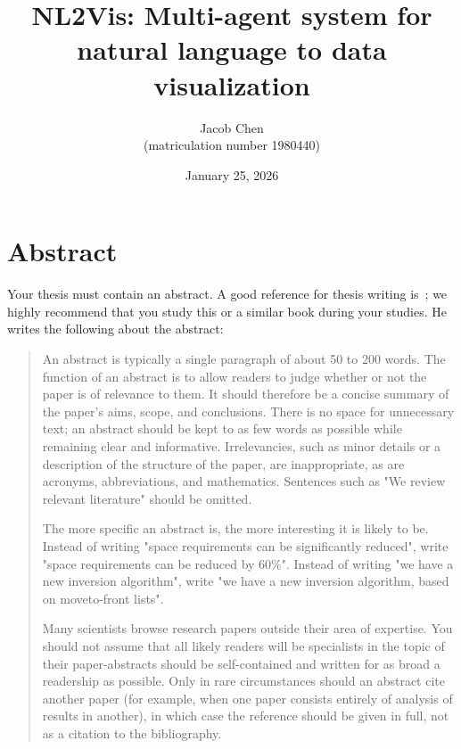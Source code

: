 \documentclass[a4paper,oneside,bibliography=totoc]{scrbook}
\begin{document}
\frontmatter \subject{Master Thesis} %
\title{NL2Vis: Multi-agent system for natural language to data visualization}
\author{Jacob Chen\\
  (matriculation number 1980440)} \date{January 25, 2026}
\publishers{{\small Submitted to}\\
  Social Data Science Group\\
  Prof.\ Dr.\ Marc Ratkovic\\
  University of Mannheim\\}
\maketitle

\chapter{Abstract}

Your thesis must contain an abstract. A good reference for thesis writing
is~\citet{zobel2014}; we highly recommend that you study this or a similar book
during your studies. He writes the following about the abstract:

\blockcquote{zobel2004}{%
  An abstract is typically a single paragraph of about 50 to 200 words. The
  function of an abstract is to allow readers to judge whether or not the paper
  is of relevance to them. It should therefore be a concise summary of the
  paper's aims, scope, and conclusions. There is no space for unnecessary text;
  an abstract should be kept to as few words as possible while remaining clear
  and informative. Irrelevancies, such as minor details or a description of the
  structure of the paper, are inappropriate, as are acronyms, abbreviations, and
  mathematics. Sentences such as "We review relevant literature" should be
  omitted.

  The more specific an abstract is, the more interesting it is likely to be.
  Instead of writing "space requirements can be significantly reduced", write
  "space requirements can be reduced by 60\%". Instead of writing "we have a new
  inversion algorithm", write "we have a new inversion algorithm, based on
  move­to-front lists".

  Many scientists browse research papers outside their area of expertise. You
  should not assume that all likely readers will be specialists in the topic of
  their paper-abstracts should be self-contained and written for as broad a
  readership as possible. Only in rare circumstances should an abstract cite
  another paper (for example, when one paper consists entirely of analysis of
  results in another), in which case the reference should be given in full, not
  as a citation to the bibliography.}
\end{document}
